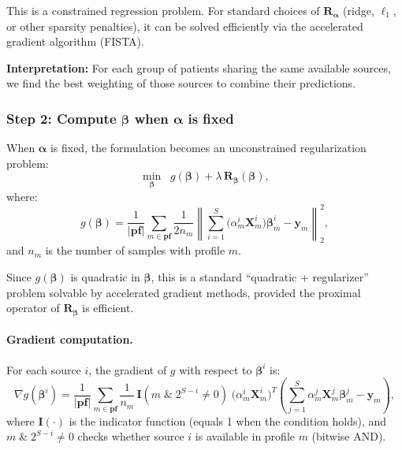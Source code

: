 \documentclass[11pt,a4paper]{article}
\begin{document}
This is a constrained regression problem. For standard choices of $\mathbf{R}_{\boldsymbol{\alpha}}$ (ridge, $\ell_1$, or other sparsity penalties), it can be solved efficiently via the accelerated gradient algorithm (FISTA).

\textbf{Interpretation:} For each group of patients sharing the same available sources, we find the best weighting of those sources to combine their predictions.

\subsubsection{Step 2: Compute $\boldsymbol{\beta}$ when $\boldsymbol{\alpha}$ is fixed}

When $\boldsymbol{\alpha}$ is fixed, the formulation becomes an unconstrained regularization problem:
\begin{equation}
\min_{\boldsymbol{\beta}} \;\; g(\boldsymbol{\beta}) + \lambda\,\mathbf{R}_{\boldsymbol{\beta}}(\boldsymbol{\beta}),
\end{equation}
where:
\begin{equation}
g(\boldsymbol{\beta}) = \frac{1}{|\mathbf{pf}|}\sum_{m \in \mathbf{pf}} \frac{1}{2n_m}
\left\|\sum_{i=1}^{S} \bigl(\alpha_m^i \mathbf{X}_m^i\bigr)\boldsymbol{\beta}_m^i - \mathbf{y}_m\right\|_2^2,
\end{equation}
and $n_m$ is the number of samples with profile $m$.

Since $g(\boldsymbol{\beta})$ is quadratic in $\boldsymbol{\beta}$, this is a standard ``quadratic + regularizer'' problem solvable by accelerated gradient methods, provided the proximal operator of $\mathbf{R}_{\boldsymbol{\beta}}$ is efficient.

\paragraph{Gradient computation.} For each source $i$, the gradient of $g$ with respect to $\boldsymbol{\beta}^i$ is:
\begin{equation}
\nabla g(\boldsymbol{\beta}^i) = \frac{1}{|\mathbf{pf}|}\sum_{m \in \mathbf{pf}} \frac{1}{n_m}\,
\mathbf{I}\!\left(m\;\&\; 2^{S-i} \neq 0\right)\;
\bigl(\alpha_m^i \mathbf{X}_m^i\bigr)^T
\left(\sum_{j=1}^{S}\alpha_m^j \mathbf{X}_m^j \boldsymbol{\beta}_m^j - \mathbf{y}_m\right),
\end{equation}
where $\mathbf{I}(\cdot)$ is the indicator function (equals 1 when the condition holds), and $m\;\&\; 2^{S-i} \neq 0$ checks whether source $i$ is available in profile $m$ (bitwise AND).
\end{document}
